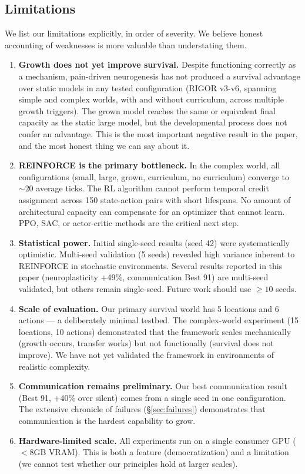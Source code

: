 \documentclass{article}
\begin{document}
\subsection{Limitations}
We list our limitations explicitly, in order of severity. We believe honest accounting of weaknesses is more valuable than understating them.
\begin{enumerate}
    \item \textbf{Growth does not yet improve survival.} Despite functioning correctly as a mechanism, pain-driven neurogenesis has not produced a survival advantage over static models in any tested configuration (RIGOR v3-v6, spanning simple and complex worlds, with and without curriculum, across multiple growth triggers). The grown model reaches the same or equivalent final capacity as the static large model, but the developmental process does not confer an advantage. This is the most important negative result in the paper, and the most honest thing we can say about it.
    \item \textbf{REINFORCE is the primary bottleneck.} In the complex world, all configurations (small, large, grown, curriculum, no curriculum) converge to $\sim 20$ average ticks. The RL algorithm cannot perform temporal credit assignment across 150 state-action pairs with short lifespans. No amount of architectural capacity can compensate for an optimizer that cannot learn. PPO, SAC, or actor-critic methods are the critical next step.
    \item \textbf{Statistical power.} Initial single-seed results (seed 42) were systematically optimistic. Multi-seed validation (5 seeds) revealed high variance inherent to REINFORCE in stochastic environments. Several results reported in this paper (neuroplasticity +49\%, communication Best 91) are multi-seed validated, but others remain single-seed. Future work should use $\ge 10$ seeds.
    \item \textbf{Scale of evaluation.} Our primary survival world has 5 locations and 6 actions --- a deliberately minimal testbed. The complex-world experiment (15 locations, 10 actions) demonstrated that the framework scales mechanically (growth occurs, transfer works) but not functionally (survival does not improve). We have not yet validated the framework in environments of realistic complexity.
    \item \textbf{Communication remains preliminary.} Our best communication result (Best 91, +40\% over silent) comes from a single seed in one configuration. The extensive chronicle of failures (\S\ref{sec:failures}) demonstrates that communication is the hardest capability to grow.
    \item \textbf{Hardware-limited scale.} All experiments run on a single consumer GPU ($<8$GB VRAM). This is both a feature (democratization) and a limitation (we cannot test whether our principles hold at larger scales).
\end{enumerate}
\end{document}
